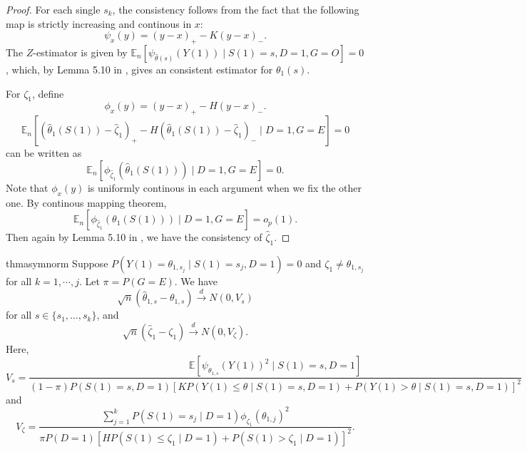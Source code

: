 \documentclass[12pt]{article}
\newcommand{\Ep}{\mathbb{E}}
\newcommand{ \littleop}{o_p}
\begin{document}
	\begin{proof}
		For each single $s_k$, the consistency follows from the fact that the following map is strictly increasing and continous in $x$:
		$$\psi_x(y) = (y - x)_+ - K (y - x)_-.$$
		The $Z$-estimator is given by $\Ep_n[\psi_{\hat{\theta}(s)}(Y(1)) \mid S(1) = s, D = 1, G = O] = 0$, which, by Lemma 5.10 in \textcite{van2000asymptotic}, gives an consistent estimator for $\theta_1(s)$.
		
		For $\zeta_1$, define $$\phi_x(y) = (y - x)_+ - H (y - x)_-.$$
		\begin{equation*}
		\mathbb{E}_n\left[(\hat{\theta}_1(S(1))-\hat{\zeta}_1)_{+}-H(\hat{\theta}_1(S(1))-\hat{\zeta}_1)_{-} \mid D=1, G = E\right] = 0
		\end{equation*} 
		can be written as 
		\begin{equation*}
		\mathbb{E}_n\left[ \phi_{\hat{\zeta}_1}(\hat{\theta}_1(S(1)))\mid D=1, G = E\right] = 0.
		\end{equation*}
		Note that $\phi_{x}(y)$ is uniformly continous in each argument when we fix the other one. By continous mapping theorem,
		\begin{equation*}
		\mathbb{E}_n\left[ \phi_{\hat{\zeta}_1}(\theta_1(S(1)))\mid D=1, G = E\right] = \littleop(1).
		\end{equation*}
		Then again by Lemma 5.10 in \textcite{van2000asymptotic}, we have the consistency of $\hat{\zeta}_1$.
	\end{proof}
	
	\begin{restatable}{thm}{asymnorm}
		\label{asymnorm}
		Suppose $P(Y(1) = \theta_{1,s_j} \mid S(1) = s_j, D = 1) = 0$ and $\zeta_1 \neq \theta_{1,s_j}$ for all $k = 1, \cdots, j$. Let $\pi = P(G = E)$. We have
		$$\sqrt{n}(\hat{\theta}_{1,s} - \theta_{1,s}) \overset{d}{\to} N(0,V_s)$$ for all $s \in \{s_1, \ldots, s_k\}$, and $$\sqrt{n}(\hat{\zeta}_1-\zeta_1) \overset{d}{\to} N(0,V_{\zeta}).$$ 
		Here, 
		$$V_s = \frac{\Ep[\psi_{\theta_{1,s}}(Y(1))^2 \mid S(1) = s, D = 1]}{(1-\pi) P(S(1)=s, D=1) [K P(Y(1) \leq \theta \mid S(1) = s, D = 1) + P(Y(1) > \theta \mid S(1) = s, D = 1)]^2}$$ and
		$$V_{\zeta} = \frac{\sum_{j=1}^k P(S(1) = s_j \mid D = 1)\phi_{\zeta_1}(\theta_{1,j})^2}{\pi P(D = 1)[H P(S(1) \leq \zeta_1 \mid D = 1) + P(S(1)  > \zeta_1 \mid D = 1)]^2}.$$
	\end{restatable}
	
\end{document}
